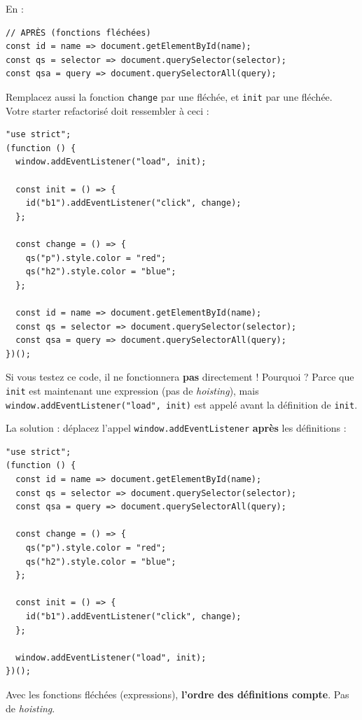 \documentclass[11pt,a4paper]{article}
\begin{document}
En :

\begin{lstlisting}
// APRÈS (fonctions fléchées)
const id = name => document.getElementById(name);
const qs = selector => document.querySelector(selector);
const qsa = query => document.querySelectorAll(query);
\end{lstlisting}

Remplacez aussi la fonction \texttt{change} par une fléchée, et \texttt{init} par une fléchée. Votre starter refactorisé doit ressembler à ceci :

\begin{lstlisting}
"use strict";
(function () {
  window.addEventListener("load", init);

  const init = () => {
    id("b1").addEventListener("click", change);
  };

  const change = () => {
    qs("p").style.color = "red";
    qs("h2").style.color = "blue";
  };

  const id = name => document.getElementById(name);
  const qs = selector => document.querySelector(selector);
  const qsa = query => document.querySelectorAll(query);
})();
\end{lstlisting}

\begin{attentionbox}
Si vous testez ce code, il ne fonctionnera \textbf{pas} directement ! Pourquoi ? Parce que \texttt{init} est maintenant une expression (pas de \emph{hoisting}), mais \texttt{window.addEventListener("load", init)} est appelé avant la définition de \texttt{init}.

La solution : déplacez l'appel \texttt{window.addEventListener} \textbf{après} les définitions :

\begin{lstlisting}
"use strict";
(function () {
  const id = name => document.getElementById(name);
  const qs = selector => document.querySelector(selector);
  const qsa = query => document.querySelectorAll(query);

  const change = () => {
    qs("p").style.color = "red";
    qs("h2").style.color = "blue";
  };

  const init = () => {
    id("b1").addEventListener("click", change);
  };

  window.addEventListener("load", init);
})();
\end{lstlisting}

Avec les fonctions fléchées (expressions), \textbf{l'ordre des définitions compte}. Pas de \emph{hoisting}.
\end{attentionbox}
\end{document}
